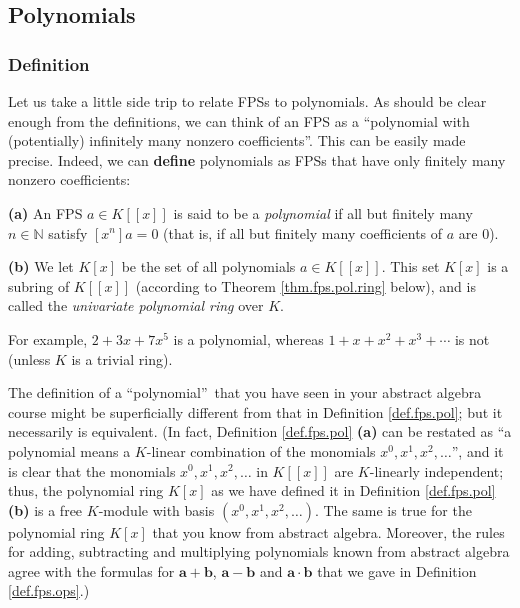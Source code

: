 \subsection{Polynomials}

\subsubsection{Definition}

Let us take a little side trip to relate FPSs to polynomials. As should be
clear enough from the definitions, we can think of an FPS as a
\textquotedblleft polynomial with (potentially) infinitely many nonzero
coefficients\textquotedblright. This can be easily made precise. Indeed, we
can \textbf{define} polynomials as FPSs that have only finitely many nonzero coefficients:

\begin{definition}
\label{def.fps.pol}\textbf{(a)} An FPS $a\in K\left[  \left[  x\right]
\right]  $ is said to be a \emph{polynomial} if all but finitely many
$n\in\mathbb{N}$ satisfy $\left[  x^{n}\right]  a=0$ (that is, if all but
finitely many coefficients of $a$ are $0$). \medskip

\textbf{(b)} We let $K\left[  x\right]  $ be the set of all polynomials $a\in
K\left[  \left[  x\right]  \right]  $. This set $K\left[  x\right]  $ is a
subring of $K\left[  \left[  x\right]  \right]  $ (according to Theorem
\ref{thm.fps.pol.ring} below), and is called the \emph{univariate polynomial
ring} over $K$.
\end{definition}

For example, $2+3x+7x^{5}$ is a polynomial, whereas $1+x+x^{2}+x^{3}+\cdots$
is not (unless $K$ is a trivial ring).

The definition of a \textquotedblleft polynomial\textquotedblright\ that you
have seen in your abstract algebra course might be superficially different
from that in Definition \ref{def.fps.pol}; but it necessarily is equivalent.
(In fact, Definition \ref{def.fps.pol} \textbf{(a)} can be restated as
\textquotedblleft a polynomial means a $K$-linear combination of the monomials
$x^{0},x^{1},x^{2},\ldots$\textquotedblright, and it is clear that the
monomials $x^{0},x^{1},x^{2},\ldots$ in $K\left[  \left[  x\right]  \right]  $
are $K$-linearly independent; thus, the polynomial ring $K\left[  x\right]  $
as we have defined it in Definition \ref{def.fps.pol} \textbf{(b)} is a free
$K$-module with basis $\left(  x^{0},x^{1},x^{2},\ldots\right)  $. The same is
true for the polynomial ring $K\left[  x\right]  $ that you know from abstract
algebra. Moreover, the rules for adding, subtracting and multiplying
polynomials known from abstract algebra agree with the formulas for
$\mathbf{a}+\mathbf{b}$, $\mathbf{a}-\mathbf{b}$ and $\mathbf{a}%
\cdot\mathbf{b}$ that we gave in Definition \ref{def.fps.ops}.)

